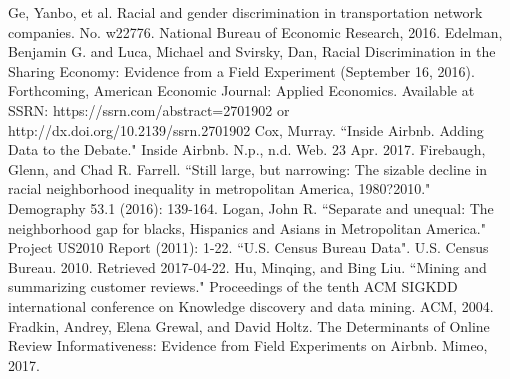 \documentclass[11pt, oneside]{article}
\begin{document}
\begin{thebibliography}{16}
Ge, Yanbo, et al. Racial and gender discrimination in transportation network companies. No. w22776. National Bureau of Economic Research, 2016.
Edelman, Benjamin G. and Luca, Michael and Svirsky, Dan, Racial Discrimination in the Sharing Economy: Evidence from a Field Experiment (September 16, 2016). Forthcoming, American Economic Journal: Applied Economics. Available at SSRN: https://ssrn.com/abstract=2701902 or http://dx.doi.org/10.2139/ssrn.2701902
Cox, Murray. ``Inside Airbnb. Adding Data to the Debate." Inside Airbnb. N.p., n.d. Web. 23 Apr. 2017.
Firebaugh, Glenn, and Chad R. Farrell. ``Still large, but narrowing: The sizable decline in racial neighborhood inequality in metropolitan America, 1980?2010." Demography 53.1 (2016): 139-164.
Logan, John R. ``Separate and unequal: The neighborhood gap for blacks, Hispanics and Asians in Metropolitan America." Project US2010 Report (2011): 1-22.
``U.S. Census Bureau Data". U.S. Census Bureau. 2010. Retrieved 2017-04-22.
Hu, Minqing, and Bing Liu. ``Mining and summarizing customer reviews." Proceedings of the tenth ACM SIGKDD international conference on Knowledge discovery and data mining. ACM, 2004.
Fradkin, Andrey, Elena Grewal, and David Holtz. The Determinants of Online Review Informativeness: Evidence from Field Experiments on Airbnb. Mimeo, 2017.
\end{thebibliography}




\end{document}
